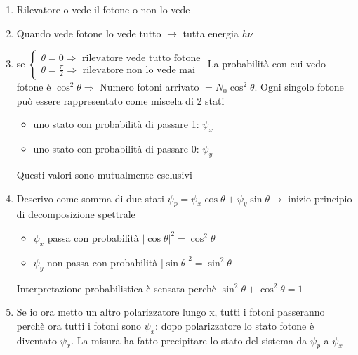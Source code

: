 \documentclass[a4paper,11pt]{report}
\theoremstyle{remark}
\theoremstyle{definition}
\begin{document}
\begin{enumerate}
    \item Rilevatore o vede il fotone o non lo vede
    \item Quando vede fotone lo vede tutto $\rightarrow $ tutta energia $h\nu$
    \item se $\begin{cases}
        \theta = 0 \Rightarrow \text{ rilevatore vede tutto fotone} \\
        \theta = \frac{\pi}{2} \Rightarrow \text{ rilevatore non lo vede mai}
    \end{cases}$ \newline
    La probabilità con cui vedo fotone è $\cos^2\theta \Rightarrow$ Numero fotoni arrivato $ = N_0\cos^2\theta$. Ogni singolo fotone può essere rappresentato come miscela di 2 stati
    \begin{itemize}
        \item uno stato con probabilità di passare 1: $\psi_x$
        \item uno stato con probabilità di passare 0: $\psi_y$
    \end{itemize}
    Questi valori sono mutualmente esclusivi
    \item Descrivo come somma di due stati $\psi_p = \psi_x \cos\theta + \psi_y \sin\theta \rightarrow$ inizio principio di decomposizione spettrale
    \begin{itemize}
        \item $\psi_x$ passa con probabilità ${|\cos\theta|}^2=\cos^2\theta$
        \item $\psi_y$ non passa con probabilità ${|\sin\theta|}^2=\sin^2\theta$
    \end{itemize}
    Interpretazione probabilistica è sensata perchè $\sin^2\theta + \cos^2\theta = 1$
    \item Se io ora metto un altro polarizzatore lungo x, tutti i fotoni passeranno perchè ora tutti i fotoni sono $\psi_x$: dopo polarizzatore lo stato fotone è diventato $\psi_x$. La misura ha fatto precipitare lo stato del sistema da $\psi_p$ a $\psi_x$
\end{enumerate}
\end{document}
